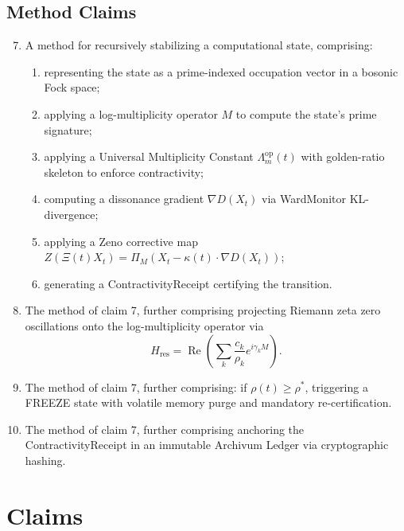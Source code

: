 \documentclass[12pt]{article}
\theoremstyle{plain}
\theoremstyle{definition}
\theoremstyle{remark}
\begin{document}
\subsection{Method Claims}

\begin{enumerate}
    \setcounter{enumi}{6}
    \item A method for recursively stabilizing a computational state, comprising:
    \begin{enumerate}
        \item representing the state as a prime-indexed occupation vector in a bosonic Fock space;
        \item applying a log-multiplicity operator $M$ to compute the state's prime signature;
        \item applying a Universal Multiplicity Constant $\Lambda_m^{\text{op}}(t)$ with golden-ratio skeleton to enforce contractivity;
        \item computing a dissonance gradient $\nabla D(X_t)$ via WardMonitor KL-divergence;
        \item applying a Zeno corrective map $Z(\Xi(t)X_t) = \Pi_M(X_t - \kappa(t)\cdot \nabla D(X_t))$;
        \item generating a ContractivityReceipt certifying the transition.
    \end{enumerate}

    \item The method of claim 7, further comprising projecting Riemann zeta zero oscillations onto the log-multiplicity operator via
    \[
    H_{\text{res}} = \operatorname{Re}\left( \sum_{k} \frac{c_k}{\rho_k} e^{i\gamma_k M} \right).
    \]

    \item The method of claim 7, further comprising: if $\rho(t) \geq \rho^*$, triggering a FREEZE state with volatile memory purge and mandatory re-certification.

    \item The method of claim 7, further comprising anchoring the ContractivityReceipt in an immutable Archivum Ledger via cryptographic hashing.
\end{enumerate}

\section{Claims}
\end{document}
